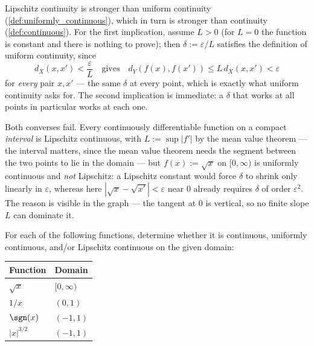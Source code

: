 \begin{remark}
\label{rem:continuity_hierarchy}
Lipschitz continuity is stronger than uniform continuity
(\cref{def:uniformly_continuous}), which in turn is stronger than continuity
(\cref{def:continuous}). For the first implication, assume $L > 0$ (for $L = 0$ the function is
constant and there is nothing to prove); then $\delta := \varepsilon/L$ satisfies the definition
of uniform continuity, since
\[d_X(x,x') < \frac{\varepsilon}{L} \quad \text{gives} \quad d_Y(f(x),f(x')) \leq L\,d_X(x,x') < \varepsilon\]
for \emph{every} pair $x,x'$ --- the same $\delta$ at every point, which is exactly what
uniform continuity asks for. The second implication is immediate: a $\delta$ that works at all
points in particular works at each one.

Both converses fail. Every continuously differentiable function on a compact \emph{interval} is
Lipschitz continuous, with $L := \sup|f'|$ by the mean value theorem --- the interval matters,
since the mean value theorem needs the segment between the two points to lie in the domain ---
but $f(x) := \sqrt{x}$ on
$[0,\infty)$ is uniformly continuous and \emph{not} Lipschitz: a Lipschitz constant would force
$\delta$ to shrink only linearly in $\varepsilon$, whereas here
$|\sqrt{x}-\sqrt{x'}| < \varepsilon$ near $0$ already requires $\delta$ of order
$\varepsilon^2$. The reason is visible in the graph --- the tangent at $0$ is vertical, so no
finite slope $L$ can dominate it.
\end{remark}

\begin{center}
\end{center}

\begin{aiexercise}
\label{ex:ai_continuity_classification}
For each of the following functions, determine whether it is continuous, uniformly continuous,
and/or Lipschitz continuous on the given domain:
\begin{center}
\begin{tabular}{ll}
\textbf{Function} & \textbf{Domain} \\
\hline
$\sqrt{x}$ & $[0,\infty)$ \\
$1/x$ & $(0,1)$ \\
$\sgn(x)$ & $(-1,1)$ \\
$|x|^{3/2}$ & $(-1,1)$
\end{tabular}
\end{center}
\end{aiexercise}

